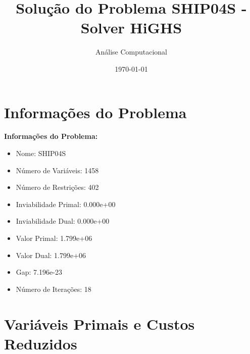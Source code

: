 \documentclass[12pt]{article}
\title{Solução do Problema SHIP04S - Solver HiGHS}
\author{Análise Computacional}
\date{\today}
\begin{document}
\maketitle

\section{Informações do Problema}

\textbf{Informações do Problema:}
\begin{itemize}
\item Nome: SHIP04S
\item Número de Variáveis: 1458
\item Número de Restrições: 402
\item Inviabilidade Primal: 0.000e+00
\item Inviabilidade Dual: 0.000e+00
\item Valor Primal: 1.799e+06
\item Valor Dual: 1.799e+06
\item Gap: 7.196e-23
\item Número de Iterações: 18
\end{itemize}


\section{Variáveis Primais e Custos Reduzidos}
\end{document}
